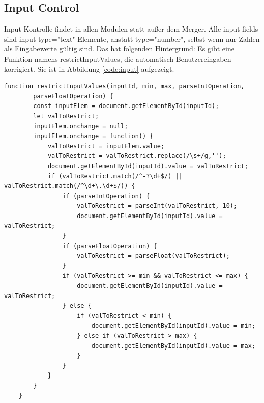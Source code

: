 \subsection{Input Control}
Input Kontrolle findet in allen Modulen statt außer dem Merger. Alle input fields sind input type="text" Elemente, anstatt type="number", selbst wenn nur Zahlen als Eingabewerte gültig sind. Das hat folgenden Hintergrund: Es gibt eine Funktion namens restrictInputValues, die automatisch Benutzereingaben korrigiert. Sie ist in Abbildung \ref{code:input} aufgezeigt.

\begin{lstlisting}[style=ES6, caption={Funktion für Inputkontrolle und Benutzereingabekorrekturen}, label=code:input, breaklines=true]
	function restrictInputValues(inputId, min, max, parseIntOperation, 
		parseFloatOperation) {
		const inputElem = document.getElementById(inputId);
		let valToRestrict;
		inputElem.onchange = null;
		inputElem.onchange = function() {
			valToRestrict = inputElem.value;
			valToRestrict = valToRestrict.replace(/\s+/g,'');
			document.getElementById(inputId).value = valToRestrict;
			if (valToRestrict.match(/^-?\d+$/) || valToRestrict.match(/^\d+\.\d+$/)) {
				if (parseIntOperation) {
					valToRestrict = parseInt(valToRestrict, 10);
					document.getElementById(inputId).value = valToRestrict;
				} 
				if (parseFloatOperation) {
					valToRestrict = parseFloat(valToRestrict);
				}
				if (valToRestrict >= min && valToRestrict <= max) {
					document.getElementById(inputId).value = valToRestrict;
				} else {
					if (valToRestrict < min) {
						document.getElementById(inputId).value = min;
					} else if (valToRestrict > max) {
						document.getElementById(inputId).value = max;
					}
				}
			}
		}
	}
\end{lstlisting} 
 
